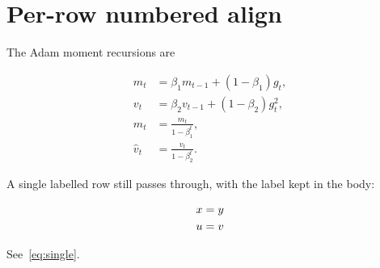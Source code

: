 \section{Per-row numbered align}

The Adam moment recursions are

\begin{align}
m_t &= \beta_1 m_{t-1} + (1-\beta_1) g_t,\\
v_t &= \beta_2 v_{t-1} + (1-\beta_2) g_t^2,\\
\hat{m}_t &= \frac{m_t}{1-\beta_1^t},\\
\hat{v}_t &= \frac{v_t}{1-\beta_2^t}.
\end{align}

A single labelled row still passes through, with the label kept in the body:

\begin{align}
x &= y \label{eq:single}\\
u &= v \notag
\end{align}

See~\eqref{eq:single}.
